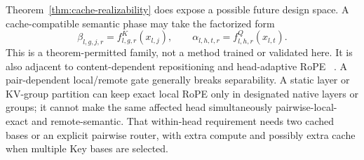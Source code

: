 Theorem~\ref{thm:cache-realizability} does expose a possible future design
space.  A cache-compatible semantic phase may take the factorized form
\begin{equation}
  \beta_{l,g,j,r}=f^K_{l,g,r}(x_{l,j}),
  \qquad
  \alpha_{l,h,t,r}=f^Q_{l,h,r}(x_{l,t}).
  \label{eq:semantic-phase-space}
\end{equation}
This is a theorem-permitted family, not a method trained or validated here.
It is also adjacent to content-dependent repositioning and head-adaptive RoPE
~\citep{li2026repo,wang2026adarope}.  A pair-dependent local/remote gate
generally breaks separability.  A static layer or KV-group partition can keep
exact local RoPE only in designated native layers or groups; it cannot make the
same affected head simultaneously pairwise-local-exact and remote-semantic.
That within-head requirement needs two cached bases or an explicit pairwise
router, with extra compute and possibly extra cache when multiple Key bases are
selected.
